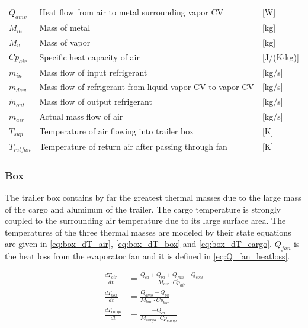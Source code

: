 \begin{center}
\begin{tabular}{l p{10cm} l}
		$Q_{amv}$        & Heat flow from air to metal surrounding vapor CV                         & [\si{W}]                          \\
		$M_{m}$          & Mass of metal                                                            & [\si{kg}]                         \\
		$M_{v}$          & Mass of vapor                                                            & [\si{kg}]                         \\
		$Cp_{air}$       & Specific heat capacity of air                                            & [\si{J}/(\si{K}$ \cdot $\si{kg})] \\
		$\dot{m}_{in} $  & Mass flow of input refrigerant                                           & [\si{kg}/\si{s}]                  \\
		$\dot{m}_{dew} $ & Mass flow of refrigerant from liquid-vapor CV to vapor CV                & [\si{kg}/\si{s}]                  \\
		$\dot{m}_{out} $ & Mass flow of output refrigerant                                          & [\si{kg}/\si{s}]                  \\
		$\dot{m}_{air}$  & Actual mass flow of air                                                  & [\si{kg}/\si{s}]                  \\
		$T_{sup} $       & Temperature of air flowing into trailer box                              & [\si{K}]                          \\
		$T_{retfan}$     & Temperature of return air after passing through fan                      & [\si{K}]
	\end{tabular}
\end{center}


\subsubsection{Box}
The trailer box contains by far the greatest thermal masses due to the large mass of the cargo and aluminum of the trailer. The cargo temperature is strongly coupled to the surrounding air temperature due to its large surface area. The temperatures of the three thermal masses are modeled by their state equations are given in \cref{eq:box_dT_air}, \cref{eq:box_dT_box} and \cref{eq:box_dT_cargo}. $Q_{fan}$ is the heat loss from the evaporator fan and it is defined in \cref{eq:Q_fan_heatloss}.

\begin{align}
	\frac{dT_{air}}{dt} & = \frac{Q_{ca} + Q_{ba} + Q_{fan} -Q_{cool}}{M_{air} \cdot Cp_{air}} 		\label{eq:box_dT_air}\\
	\frac{dT_{box}}{dt} & = \frac{Q_{amb} - Q_{ba}}{M_{box} \cdot Cp_{box}} 						\label{eq:box_dT_box}\\
	\frac{dT_{cargo}}{dt} & = \frac{-Q_{ca}}{M_{cargo} \cdot Cp_{cargo}}							\label{eq:box_dT_cargo}
\end{align}

